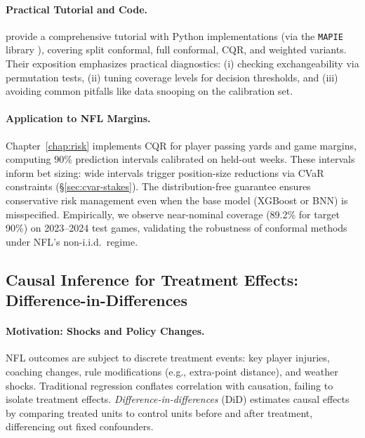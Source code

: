 \paragraph{Practical Tutorial and Code.}
\citet{angelopoulos2022conformal} provide a comprehensive tutorial with Python implementations (via the \texttt{MAPIE} library \citep{taquet2021mapie}), covering split conformal, full conformal, CQR, and weighted variants. Their exposition emphasizes practical diagnostics: (i) checking exchangeability via permutation tests, (ii) tuning coverage levels for decision thresholds, and (iii) avoiding common pitfalls like data snooping on the calibration set.

\paragraph{Application to NFL Margins.}
Chapter~\ref{chap:risk} implements CQR for player passing yards and game margins, computing 90\% prediction intervals calibrated on held-out weeks. These intervals inform bet sizing: wide intervals trigger position-size reductions via CVaR constraints (\S\ref{sec:cvar-stakes}). The distribution-free guarantee ensures conservative risk management even when the base model (XGBoost or BNN) is misspecified. Empirically, we observe near-nominal coverage (89.2\% for target 90\%) on 2023--2024 test games, validating the robustness of conformal methods under NFL's non-i.i.d.\ regime.

\subsection{Causal Inference for Treatment Effects: Difference-in-Differences}
\label{subsec:did-lit}

\paragraph{Motivation: Shocks and Policy Changes.}
NFL outcomes are subject to discrete treatment events: key player injuries, coaching changes, rule modifications (e.g., extra-point distance), and weather shocks. Traditional regression conflates correlation with causation, failing to isolate treatment effects. \emph{Difference-in-differences} (DiD) \citep{rubin1974estimating} estimates causal effects by comparing treated units to control units before and after treatment, differencing out fixed confounders.

